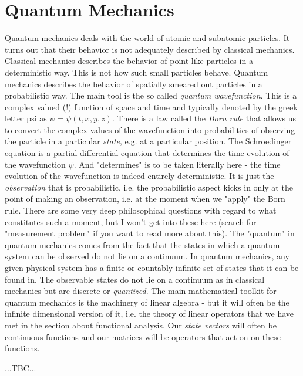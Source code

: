 \section{Quantum Mechanics}
Quantum mechanics deals with the world of atomic and subatomic particles. It turns out that their behavior is not adequately described by classical mechanics. Classical mechanics describes the behavior of point like particles in a deterministic way. This is not how such small particles behave. Quantum mechanics describes the behavior of spatially smeared out particles in a probabilistic way. The main tool is the so called \emph{quantum wavefunction}. This is a complex valued (!) function of space and time and typically denoted by the greek letter psi as $\psi = \psi(t,x,y,z)$. There is a law called the \emph{Born rule} that allows us to convert the complex values of the wavefunction into probabilities of observing the particle in a particular \emph{state}, e.g. at a particular position. The Schroedinger equation is a partial differential equation that determines the time evolution of the wavefunction $\psi$. And "determines" is to be taken literally here - the time evolution of the wavefunction is indeed entirely deterministic. It is just the \emph{observation} that is probabilistic, i.e. the probabilistic aspect kicks in only at the point of making an observation, i.e. at the moment when we "apply" the Born rule. There are some very deep philosophical questions with regard to what constitutes such a moment, but I won't get into these here (search for "measurement problem" if you want to read more about this). The "quantum" in quantum mechanics comes from the fact that the states in which a quantum system can be observed do not lie on a continuum. In quantum mechanics, any given physical system has a finite or countably infinite set of states that it can be found in. The observable states do not lie on a continuum as in classical mechanics but are discrete or \emph{quantized}. The main mathematical toolkit for quantum mechanics is the machinery of linear algebra - but it will often be the infinite dimensional version of it, i.e. the theory of linear operators that we have met in the section about functional analysis. Our \emph{state vectors} will often be continuous functions and our matrices will be operators that act on on these functions. 

...TBC...

